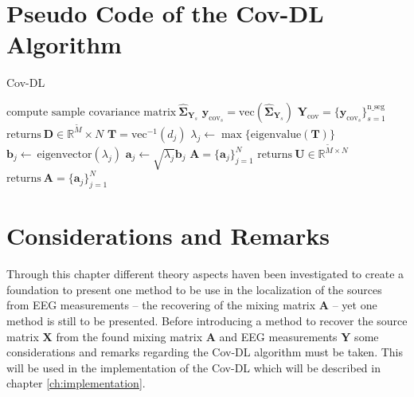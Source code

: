 \section{Pseudo Code of the Cov-DL Algorithm}\label{seg:alg_cov}
\begin{algorithm}[H]
\caption{Cov-DL}
\begin{algorithmic}[1]
				\State$\text{compute sample covariance matrix}\ \widehat{\boldsymbol{\Sigma}}_{\textbf{Y}_s} $
				\State$\textbf{y}_{\text{cov}_s} = \text{vec}(\widehat{\boldsymbol{\Sigma}}_{\textbf{Y}_s})$	
			\EndFor			
			\State$\textbf{Y}_{\text{cov}} = \{\textbf{y}_{\text{cov}_s}\}_{s=1}^{\text{n\_seg}}$
			\State
			\State$\text{returns} \ \textbf{D} \in \mathbb{R}^{\widetilde{M}}\times N$
			\EndProcedure
			\State$\textbf{T} = \text{vec}^{-1}(d_j)$            
			\State$\lambda_j\gets \max\{\text{eigenvalue}(\textbf{T})\}$
			\State$\textbf{b}_j \gets \ \text{eigenvector}(\lambda_j)$
			\State$\textbf{a}_j \gets \sqrt{\lambda_j}\textbf{b}_j$
			\EndFor
			\State$\textbf{A} = \{\textbf{a}_j\}_{j=1}^N$
			\EndIf
			\State
				\State$\text{returns} \ \textbf{U}\in \mathbb{R}^{\widetilde{M}\times N}$
				\EndProcedure
				\State$\text{returns}\ \textbf{A}= \{\textbf{a}_j\}_{j=1}^{N}$
				\EndProcedure
			\EndIf
           \EndProcedure
        \end{algorithmic} 
        \label{alg:Cov1}
\end{algorithm}

\section{Considerations and Remarks}
Through this chapter different theory aspects haven been investigated to create a foundation to present one method to be use in the localization of the sources from EEG measurements -- the recovering of the mixing matrix $\mathbf{A}$ -- yet one method is still to be presented.
Before introducing a method to recover the source matrix $\mathbf{X}$ from the found mixing matrix $\mathbf{A}$ and EEG measurements $\mathbf{Y}$ some considerations and remarks regarding the Cov-DL algorithm must be taken. 
This will be used in the implementation of the Cov-DL which will be described in chapter \ref{ch:implementation}.

